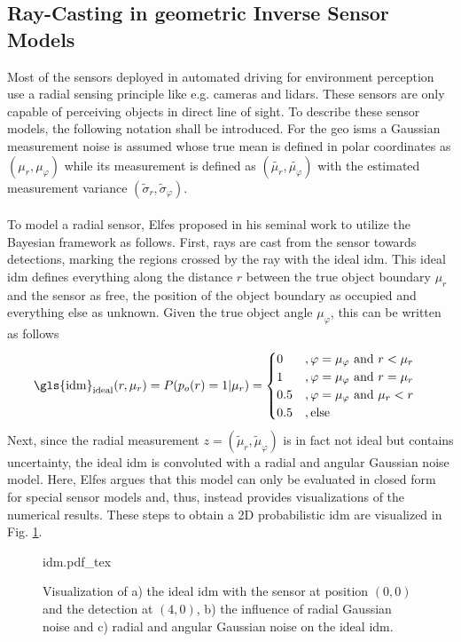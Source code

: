 \subsection{Ray-Casting in geometric Inverse Sensor Models}
\label{subsec:ray_casting}
Most of the sensors deployed in automated driving for environment perception use a radial sensing principle like e.g. cameras and lidars. These sensors are only capable of perceiving objects in direct line of sight. To describe these sensor models, the following notation shall be introduced. For the geo \gls{ism}s a Gaussian measurement noise is assumed whose true mean is defined in polar coordinates as $(\mu_r, \mu_\varphi)$ while its measurement is defined as $(\tilde{\mu_r}, \tilde{\mu_\varphi})$ with the estimated measurement variance $(\tilde{\sigma}_r, \tilde{\sigma}_\varphi)$.
\\\\
To model a radial sensor, Elfes \cite{elfes1989using} proposed in his seminal work to utilize the Bayesian framework as follows. First, rays are cast from the sensor towards detections, marking the regions crossed by the ray with the ideal \gls{idm}. This ideal \gls{idm} defines everything along the distance $r$ between the true object boundary $\mu_r$ and the sensor as free, the position of the object boundary as occupied and everything else as unknown. Given the true object angle $\mu_{\varphi}$,  this can be written as follows 
\begin{align}
	\label{eq:ideal_idm}
	\text{\gls{idm}}_{\text{ideal}}(r,\mu_r) = P(p_o(r) = 1 |\mu_r) &= 
	\begin{cases}
		0 &, \varphi = \mu_{\varphi} \text{ and } r < \mu_r\\
		1 &, \varphi = \mu_{\varphi} \text{ and }r = \mu_r\\
		0.5 &, \varphi = \mu_{\varphi} \text{ and } \mu_r < r\\				
		0.5 &, \text{else}		
	\end{cases}
\end{align}
Next, since the radial measurement $z = (\tilde{\mu}_r, \tilde{\mu}_{\varphi})$ is in fact not ideal but contains uncertainty, the ideal \gls{idm} is convoluted with a radial and angular Gaussian noise model. Here, Elfes argues that this model can only be evaluated in closed form for special sensor models and, thus, instead provides visualizations of the numerical results. These steps to obtain a 2D probabilistic \gls{idm} are visualized in Fig. \ref{fig:idm}.
\begin{figure}
	\begin{center}
		{idm.pdf_tex}
		\caption{\label{fig:idm} Visualization of a) the ideal \gls{idm} with the sensor at position $(0,0)$ and the detection at $(4,0)$, b) the influence of radial Gaussian noise and c) radial and angular Gaussian noise on the ideal \gls{idm}.}
	\end{center}
\end{figure}  
